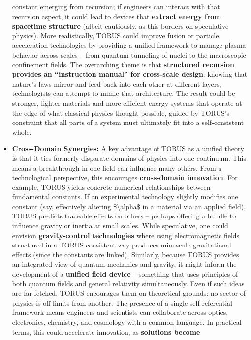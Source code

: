 \begin{itemize}
  constant emerging from recursion; if engineers can interact with that
  recursion aspect, it could lead to devices that \textbf{extract energy
  from spacetime structure} (albeit cautiously, as this borders on
  speculative physics). More realistically, TORUS could improve fusion
  or particle acceleration technologies by providing a unified framework
  to manage plasma behavior across scales -- from quantum tunneling of
  nuclei to the macroscopic confinement fields. The overarching theme is
  that \textbf{structured recursion provides an ``instruction manual''
  for cross-scale design}: knowing that nature's laws mirror and feed
  back into each other at different layers, technologists can attempt to
  mimic that architecture. The result could be stronger, lighter
  materials and more efficient energy systems that operate at the edge
  of what classical physics thought possible, guided by TORUS's
  constraint that all parts of a system must ultimately fit into a
  self-consistent whole.
\item
  \textbf{Cross-Domain Synergies:} A key advantage of TORUS as a unified
  theory is that it ties formerly disparate domains of physics into one
  continuum. This means a breakthrough in one field can influence many
  others. From a technological perspective, this encourages
  \textbf{cross-domain innovation}. For example, TORUS yields concrete
  numerical relationships between fundamental constants​. If an
  experimental technology slightly modifies one constant (say,
  effectively altering \$\textbackslash{}alpha\$ in a material via an
  applied field), TORUS predicts traceable effects on others -- perhaps
  offering a handle to influence gravity or inertia at small scales.
  While speculative, one could envision \textbf{gravity-control
  technologies} where using electromagnetic fields structured in a
  TORUS-consistent way produces minuscule gravitational effects (since
  the constants are linked). Similarly, because TORUS provides an
  integrated view of quantum mechanics and gravity, it might inform the
  development of a \textbf{unified field device} -- something that uses
  principles of both quantum fields and general relativity
  simultaneously. Even if such ideas are far-fetched, TORUS encourages
  them on theoretical grounds: no sector of physics is off-limits from
  another. The presence of a single self-referential framework means
  engineers and scientists can collaborate across optics, electronics,
  chemistry, and cosmology with a common language. In practical terms,
  this could accelerate innovation, as \textbf{solutions become
}
\end{itemize}
